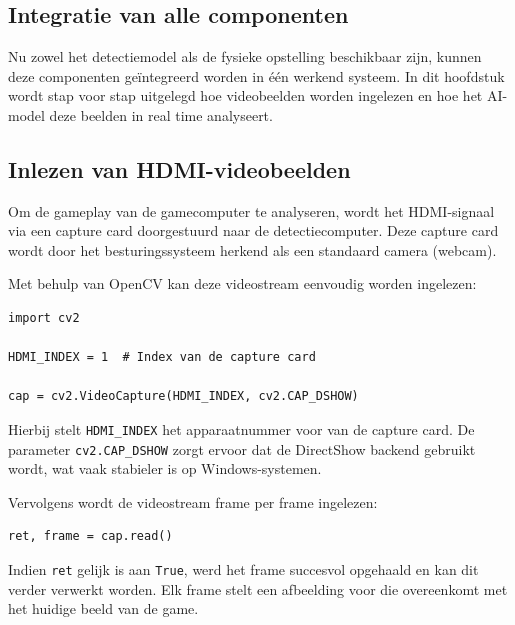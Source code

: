 \chapter{}
\label{ch:Integratie-van-alle-componenten}

\section{Integratie van alle componenten}

Nu zowel het detectiemodel als de fysieke opstelling beschikbaar zijn, kunnen deze componenten geïntegreerd worden in één werkend systeem. In dit hoofdstuk wordt stap voor stap uitgelegd hoe videobeelden worden ingelezen en hoe het AI-model deze beelden in real time analyseert.

\section{Inlezen van HDMI-videobeelden}

Om de gameplay van de gamecomputer te analyseren, wordt het HDMI-signaal via een capture card doorgestuurd naar de detectiecomputer. Deze capture card wordt door het besturingssysteem herkend als een standaard camera (webcam).

Met behulp van OpenCV kan deze videostream eenvoudig worden ingelezen:

\begin{verbatim}
import cv2

HDMI_INDEX = 1  # Index van de capture card

cap = cv2.VideoCapture(HDMI_INDEX, cv2.CAP_DSHOW)
\end{verbatim}

Hierbij stelt \texttt{HDMI\_INDEX} het apparaatnummer voor van de capture card. De parameter \texttt{cv2.CAP\_DSHOW} zorgt ervoor dat de DirectShow backend gebruikt wordt, wat vaak stabieler is op Windows-systemen.

Vervolgens wordt de videostream frame per frame ingelezen:

\begin{verbatim}
ret, frame = cap.read()
\end{verbatim}

Indien \texttt{ret} gelijk is aan \texttt{True}, werd het frame succesvol opgehaald en kan dit verder verwerkt worden. Elk frame stelt een afbeelding voor die overeenkomt met het huidige beeld van de game.

